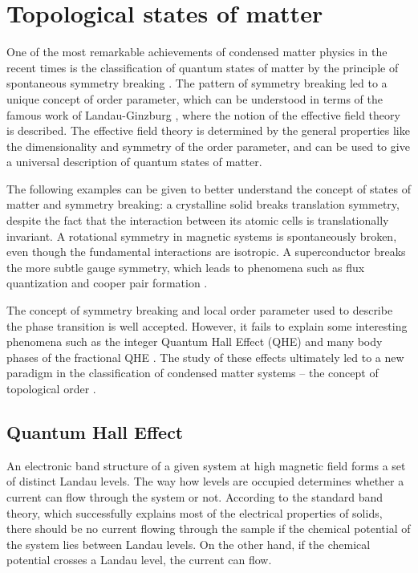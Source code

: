 \documentclass[titlepage,a4paper]{book}
\newcommand{\wciecie}{\quad\phantom{v}}
\begin{document}
\section{Topological states of matter}
\wciecie
One of the most remarkable achievements of condensed matter physics in the recent times is the classification of quantum states of matter by the principle of spontaneous symmetry breaking \cite{Anderson_Topology}. The pattern of symmetry breaking led to a unique concept of order parameter, which can be understood in terms of the famous work of Landau-Ginzburg \cite{Landau_Topology}, where the notion of the effective field theory is described. The effective field theory is determined by the general properties like the dimensionality and symmetry of the order parameter, and can be used to give a universal description of quantum states of matter.

The following examples can be given to better understand the concept of states of matter and symmetry breaking: a crystalline solid breaks translation symmetry, despite the fact that the interaction between its atomic cells is translationally invariant. A rotational symmetry in magnetic systems is spontaneously broken, even though the fundamental interactions are isotropic. A superconductor breaks the more subtle gauge symmetry, which leads to phenomena such as flux quantization and cooper pair formation \cite{Josephson_Topology}.

The concept of symmetry breaking and local order parameter used to describe the phase transition is well accepted. However, it fails to explain some interesting phenomena such as the integer Quantum Hall Effect (QHE) \cite{Klitzing_Topology} and many body phases of the fractional QHE \cite{Tsui_Topology}. The study of these effects ultimately led to a new paradigm in the classification of condensed matter systems -- the concept of topological order \cite{Laughlin_Topology} \cite{Thouless_Topology}.

\subsection{Quantum Hall Effect}
\wciecie
An electronic band structure of a given system at high magnetic field forms a set of distinct Landau levels. The way how levels are occupied determines whether a current can flow through the system or not. According to the standard band theory, which successfully explains most of the electrical properties of solids, there should be no current flowing through the sample if the chemical potential of the system lies between Landau levels. On the other hand, if the chemical potential crosses a Landau level, the current can flow. 
\end{document}
